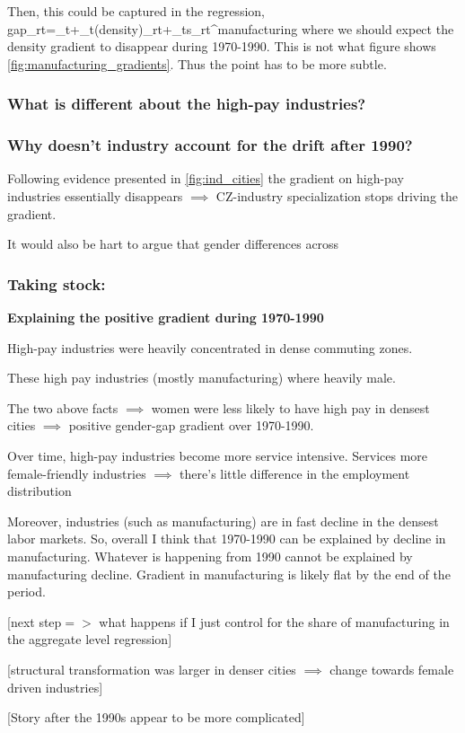 Then, this could be captured in the regression,
\beqns
	gap_{rt}=\alpha_t+\beta_{t}\ln(density)_{rt}+\chi_ts_{rt}^{manufacturing}
\eeqns
where we should expect the density gradient to disappear during 1970-1990. This is not what figure shows \ref{fig:manufacturing_gradients}. Thus the point has to be more subtle.




\subsubsection{What is different about the high-pay industries?}



\subsubsection{Why doesn't industry account for the drift after 1990?}

Following evidence presented in \ref{fig:ind_cities} the gradient on high-pay industries essentially disappears $\implies$ CZ-industry specialization stops driving the gradient.

It would also be hart to argue that gender differences  across 




\subsubsection{Taking stock:}
\textbf{Explaining the positive gradient during 1970-1990}
\bitem
	\item High-pay industries were heavily concentrated in dense commuting zones.
	\item These high pay industries (mostly manufacturing) where heavily male.
	\item The two above facts $\implies$ women were less likely to have high pay in densest cities $\implies$ positive gender-gap gradient over 1970-1990.
\eitem
\bitem
	\item Over time, high-pay industries become more service intensive. Services more female-friendly industries $\implies$ there's little difference in the employment distribution 
	\item Moreover, industries (such as manufacturing) are in fast decline in the densest labor markets.
\eitem
So, overall I think that 1970-1990 can be explained by decline in manufacturing. Whatever is happening from 1990 cannot be explained by manufacturing decline. Gradient in manufacturing is likely flat by the end of the period.	

[next step$=>$ what happens if I just control for the share of manufacturing in the aggregate level regression]

[structural transformation was larger in denser cities $\implies$ change towards female driven industries]

[Story after the 1990s appear to be more complicated]